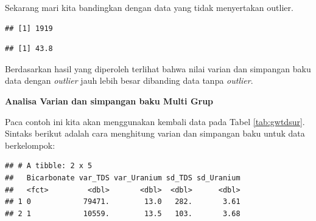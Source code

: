\documentclass[]{book}
\newenvironment{Shaded}{\begin{snugshade}}{\end{snugshade}}
\newcommand{\KeywordTok}[1]{\textcolor[rgb]{0.13,0.29,0.53}{\textbf{#1}}}
\newcommand{\DataTypeTok}[1]{\textcolor[rgb]{0.13,0.29,0.53}{#1}}
\newcommand{\StringTok}[1]{\textcolor[rgb]{0.31,0.60,0.02}{#1}}
\newcommand{\CommentTok}[1]{\textcolor[rgb]{0.56,0.35,0.01}{\textit{#1}}}
\newcommand{\OperatorTok}[1]{\textcolor[rgb]{0.81,0.36,0.00}{\textbf{#1}}}
\newcommand{\NormalTok}[1]{#1}
\begin{document}
Sekarang mari kita bandingkan dengan data yang tidak menyertakan
outlier.

\begin{Shaded}
\end{Shaded}

\begin{verbatim}
## [1] 1919
\end{verbatim}

\begin{Shaded}
\end{Shaded}

\begin{verbatim}
## [1] 43.8
\end{verbatim}

Berdasarkan hasil yang diperoleh terlihat bahwa nilai varian dan
simpangan baku data dengan \emph{outlier} jauh lebih besar dibanding
data tanpa \emph{outlier}.

\textbf{Analisa Varian dan simpangan baku Multi Grup}

Paca contoh ini kita akan menggunakan kembali data pada Tabel
\ref{tab:gwtdsur}. Sintaks berikut adalah cara menghitung varian dan
simpangan baku untuk data berkelompok:

\begin{Shaded}
\end{Shaded}

\begin{verbatim}
## # A tibble: 2 x 5
##   Bicarbonate var_TDS var_Uranium sd_TDS sd_Uranium
##   <fct>         <dbl>       <dbl>  <dbl>      <dbl>
## 1 0            79471.        13.0   282.       3.61
## 2 1            10559.        13.5   103.       3.68
\end{verbatim}
\end{document}
